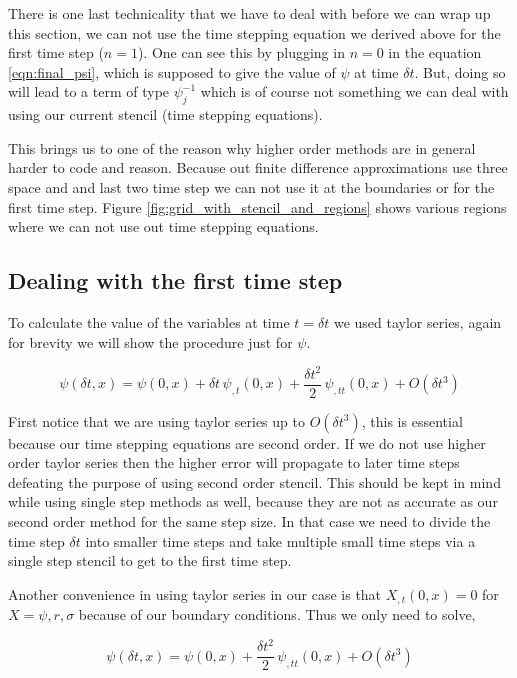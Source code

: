 There is one last technicality that we have to deal with before we can wrap up this section, we can not use the time stepping equation we derived above for the first time step ($n=1$). One can see this by plugging in $n=0$ in the equation \ref{eqn:final_psi}, which is supposed to give the value of $\psi$ at time $\delta t$. But, doing so will lead to a term of type $\psi^{-1}_j$ which is of course not something we can deal with using our current stencil (time stepping equations).


This brings us to one of the reason why higher order methods are in general harder to code and reason. Because out finite difference approximations use three space and and last two time step we can not use it at the boundaries or for the first time step. Figure \ref{fig:grid_with_stencil_and_regions} shows various regions where we can not use out time stepping equations.


\subsection{Dealing with the first time step}

To calculate the value of the variables at time $t = \delta t$ we used taylor series, again for brevity we will show the procedure just for $\psi$.

\begin{equation*}
    \psi(\delta t,x) = \psi(0,x) + \delta t\, \psi_{,t}(0,x) + \frac{\delta t^2}{2} \, \psi_{,tt}(0,x) + O(\delta t^3)
\end{equation*}


First notice that we are using taylor series up to $O(\delta t^3)$, this is essential because our time stepping equations are second order. If we do not use higher order taylor series then the higher error will propagate to later time steps defeating the purpose of using second order stencil. This should be kept in mind while using single step methods as well, because they are not as accurate as our second order method for the same step size. In that case we need to divide the time step $\delta t$ into smaller time steps and take multiple small time steps via a single step stencil to get to the first time step.


Another convenience in using taylor series in our case is that $X_{,t}(0,x) = 0$ for $X = \psi, r ,\sigma$ because of our boundary conditions. Thus we only need to solve,

\begin{equation*}
    \psi(\delta t,x) = \psi(0,x) + \frac{\delta t^2}{2} \, \psi_{,tt}(0,x) + O(\delta t^3)
\end{equation*}

